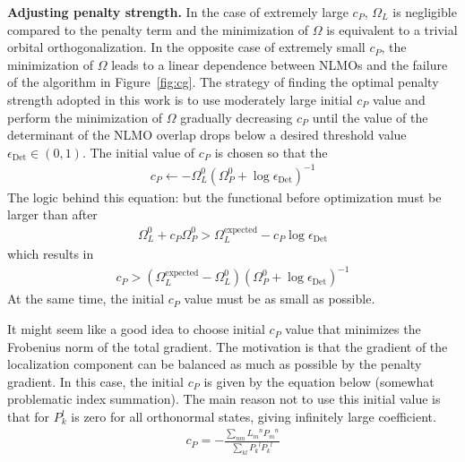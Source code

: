 \documentclass[aps,prl,reprint,amsmath,amssymb]{revtex4-1}
\begin{document}
\textbf{Adjusting penalty strength.} In the case of extremely large $c_P$, $\Omega_L$ is negligible compared to the penalty term and the minimization of $\Omega$ is equivalent to a trivial orbital orthogonalization. In the opposite case of extremely small $c_P$, the minimization of $\Omega$ leads to a linear dependence between NLMOs and the failure of the algorithm in Figure~\ref{fig:cg}. %
The strategy of finding the optimal penalty strength adopted in this work is to use moderately large initial $c_P$ value and perform the minimization of $\Omega$ gradually decreasing $c_P$ until the value of the determinant of the NLMO overlap drops below a desired threshold value $\epsilon_{\text{Det}} \in (0,1)$. The initial value of $c_P$ is chosen so that the 
%
\begin{equation}
\begin{split}
c_{P} \gets - \Omega^0_{L}(\Omega^0_P + \log \epsilon_{\text{Det}})^{-1}  
\end{split}
\end{equation}
%
The logic behind this equation: but the functional before optimization must be larger than after 
%
\begin{equation}
\begin{split}
\Omega^0_{L} + c_P \Omega^0_P > \Omega^{\text{expected}}_L - c_P \log \epsilon_{\text{Det}} 
\end{split}
\end{equation}
%
which results in
%
\begin{equation}
\begin{split}
c_P > (\Omega^{\text{expected}}_L - \Omega^0_{L}) (\Omega^0_P + \log \epsilon_{\text{Det}})^{-1}
\end{split}
\end{equation}
%
At the same time, the initial $c_P$ value must be as small as possible.

{\color{red} It might seem like a good idea to choose initial $c_P$ value that minimizes the Frobenius norm of the total gradient. The motivation is that the gradient of the localization component can be balanced as much as possible by the penalty gradient. In this case, the initial $c_P$ is given by the equation below (somewhat problematic index summation). The main reason not to use this initial value is that for $P_k^l$ is zero for all orthonormal states, giving infinitely large coefficient.
%
\begin{equation}
\begin{split}
c_P = - \frac{ \sum_{nm} {L_m}^n {P_m}^n}{ \sum_{kl} {P_k}^l {P_k}^l}  
\end{split}
\end{equation}
%
}
\end{document}
